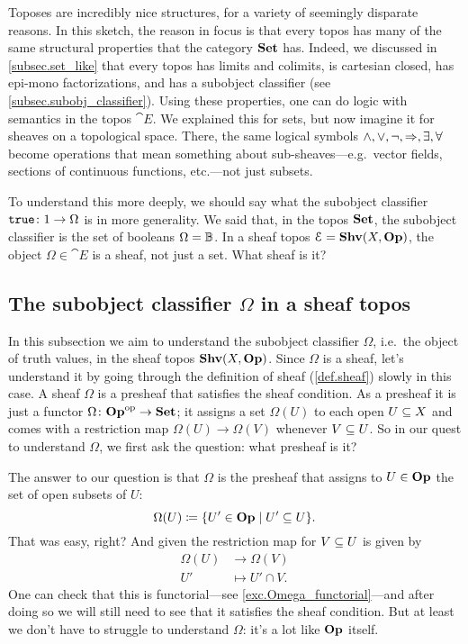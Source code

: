 \documentclass[7Sketches]{subfiles}
\begin{document}
Toposes are incredibly nice structures, for a variety of seemingly disparate
reasons. In this sketch, the reason in focus is that every topos has many of the
same structural properties that the category $\smset$ has.  Indeed, we
discussed in \cref{subsec.set_like} that every topos has limits and colimits, is
cartesian closed, has epi-mono factorizations, and has a subobject classifier
(see \cref{subsec.subobj_classifier}). Using these properties, one can do logic
with semantics in the topos $\cat{E}$. We explained this for sets, but now
imagine it for sheaves on a topological space. There, the same logical symbols
$\wedge, \vee, \neg,\imp,\exists,\forall$ become operations that mean something
about sub-sheaves---e.g.\ vector fields, sections of continuous functions,
etc.---not just subsets.%
%

To understand this more deeply, we should say what the subobject classifier
$\true\colon 1 \to \Omega$ is in more generality.  We said that, in the topos $\smset$, the  subobject classifier is the set of booleans
$\Omega=\BB$. In a sheaf topos $\cat{E}=\Shv(X,\Op)$, the object $\Omega\in\cat{E}$ is
a sheaf, not just a set. What sheaf is it? 

\subsection{The subobject classifier $\Omega$ in a sheaf
topos}%
\label{subsec.subob_class_sheaf_topos}%

In this subsection we aim to understand the subobject classifier $\Omega$, i.e.\
the object of truth values, in the sheaf topos $\Shv(X,\Op)$. Since $\Omega$ is
a sheaf, let's understand it by going through the definition of sheaf
(\cref{def.sheaf}) slowly in this case. A sheaf $\Omega$ is a presheaf that
satisfies the sheaf condition. As a presheaf it is just a functor
$\Omega\colon\Op\op\to\smset$; it assigns a set $\Omega(U)$ to each open
$U\ss X$ and comes with a restriction map $\Omega(U)\to\Omega(V)$ whenever $V\ss
U$. So in our quest to understand $\Omega$, we first ask the question: what
presheaf is it?

The answer to our question is that $\Omega$ is the presheaf that assigns to
$U\in\Op$ the set of open subsets of $U$:
\begin{equation}%
\label{eqn.omega_as_opens}
  \Omega(U)\coloneqq\{U'\in\Op\mid U'\ss U\}.
\end{equation}
That was easy, right? And given the restriction map for $V\ss U$ is given by
\begin{align}%
\label{eqn.omega_open_rest}
	\Omega(U)&\to\Omega(V)\\\nonumber	
	U'&\mapsto U'\cap V.
\end{align}
One can check that this is
functorial---see \cref{exc.Omega_functorial}---and after doing so we will still
need to see that it satisfies the sheaf condition. But at least we don't have to
struggle to understand $\Omega$: it's a lot like $\Op$ itself.
\end{document}
